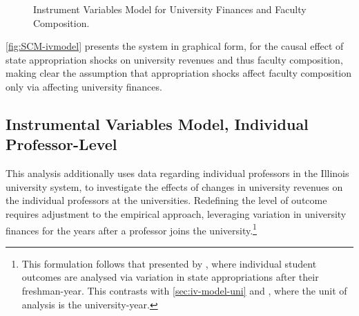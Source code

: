 \documentclass[notitlepage,12pt]{article}
\begin{document}
\begin{figure}[H]
    \centering
    \singlespacing
    \caption{Instrument Variables Model for University Finances and Faculty Composition.}
    \label{fig:SCM-ivmodel}
\end{figure}

\autoref{fig:SCM-ivmodel} presents the system in graphical form, for the causal effect of state appropriation shocks on university revenues and thus faculty composition, making clear the assumption that appropriation shocks affect faculty composition only via affecting university finances.


\subsection{Instrumental Variables Model, Individual Professor-Level}
\label{sec:iv-model-indiv}

This analysis additionally uses data regarding individual professors in the Illinois university system, to investigate the effects of changes in university revenues on the individual professors at the universities.
Redefining the level of outcome requires adjustment to the empirical approach, leveraging variation in university finances for the years after a professor joins the university.\footnote{
    This formulation follows that presented by \cite{NBERw27885}, where individual student outcomes are analysed via variation in state appropriations after their freshman-year.
    This contrasts with \autoref{sec:iv-model-uni} and \cite{NBERw23736}, where the unit of analysis is the university-year.
}
\end{document}
